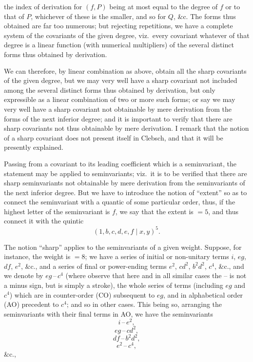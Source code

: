 \documentclass[11pt]{article}
\begin{document}
the index of derivation for $(f, P)$ being at most equal to the degree of $f$ or to that of $P$, whichever of these is the smaller, and so for $Q$, \&c. The forms thus obtained are far too numerous; but rejecting repetitions, we have a complete system of the covariants of the given degree, viz.\ every covariant whatever of that degree is a linear function (with numerical multipliers) of the several distinct forms thus obtained by derivation.

We can therefore, by linear combination as above, obtain all the sharp covariants of the given degree, but we may very well have a sharp covariant not included among the several distinct forms thus obtained by derivation, but only expressible as a linear combination of two or more such forms; or say we may very well have a sharp covariant not obtainable by mere derivation from the forms of the next inferior degree; and it is important to verify that there are sharp covariants not thus obtainable by mere derivation. I remark that the notion of a sharp covariant does not present itself in Clebsch, and that it will be presently explained.

Passing from a covariant to its leading coefficient which is a seminvariant, the statement may be applied to seminvariants; viz.\ it is to be verified that there are sharp seminvariants not obtainable by mere derivation from the seminvariants of the next inferior degree. But we have to introduce the notion of ``extent'' so as to connect the seminvariant with a quantic of some particular order, thus, if the highest letter of the seminvariant is $f$, we say that the extent is $=5$, and thus connect it with the quintic
\[ (1, b, c, d, e, f \mid x, y)^5. \]

The notion ``sharp'' applies to the seminvariants of a given weight. Suppose, for instance, the weight is $=8$; we have a series of initial or non-unitary terms $i$, $eg$, $df$, $e^2$, \&c., and a series of final or power-ending terms $e^2$, $cd^2$, $b^2d^2$, $c^4$, \&c., and we denote by $eg\,\text{--}\,c^4$ (where observe that here and in all similar cases the $\text{--}$ is not a minus sign, but is simply a stroke), the whole series of terms (including $eg$ and $c^4$) which are in counter-order (CO) subsequent to $eg$, and in alphabetical order (AO) precedent to $c^4$; and so in other cases. This being so, arranging the seminvariants with their final terms in AO, we have the seminvariants
\[ i\,\text{--}\,e^2, \]
\[ eg\,\text{--}\,cd^2, \]
\[ df\,\text{--}\,b^2d^2, \]
\[ e^2\,\text{--}\,c^4, \]
\&c.,
\end{document}
